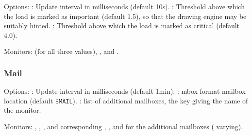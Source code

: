 Options: : Update interval in milliseconds
(default 10s). : Threshold above which 
the load is marked as important (default 1.5), so that the 
drawing engine may be suitably hinted. : 
Threshold above which  the load is marked as critical (default 4.0).


Monitors:  (for all three values), 
,  and .


\subsubsection{Mail}

Options: : Update interval in milliseconds
(default 1min). : mbox-format mailbox location
(default \verb!$MAIL!). 
: list of additional mailboxes, the key giving the 
name of the monitor.

Monitors: , ,
, and corresponding
, , and 
for the additional mailboxes (\code{*} varying).
